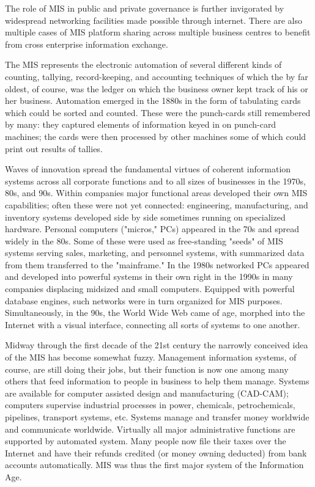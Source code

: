 \documentclass[
  openany]{book}
\begin{document}
\begin{questions}
The role of MIS in public and private governance is further invigorated by widespread networking facilities made possible through internet. There are also multiple cases of MIS platform sharing across multiple business centres to benefit from cross enterprise information exchange.

The MIS represents the electronic automation of several different kinds of counting, tallying, record-keeping, and accounting techniques of which the by far oldest, of course, was the ledger on which the business owner kept track of his or her business. Automation emerged in the 1880s in the form of tabulating cards which could be sorted and counted. These were the punch-cards still remembered by many: they captured elements of information keyed in on punch-card machines; the cards were then processed by other machines some of which could print out results of tallies. 

Waves of innovation spread the fundamental virtues of coherent information systems across all corporate functions and to all sizes of businesses in the 1970s, 80s, and 90s. Within companies major functional areas developed their own MIS capabilities; often these were not yet connected: engineering, manufacturing, and inventory systems developed side by side sometimes running on specialized hardware. Personal computers ("micros," PCs) appeared in the 70s and spread widely in the 80s. Some of these were used as free-standing "seeds" of MIS systems serving sales, marketing, and personnel systems, with summarized data from them transferred to the "mainframe." In the 1980s networked PCs appeared and developed into powerful systems in their own right in the 1990s in many companies displacing midsized and small computers. Equipped with powerful database engines, such networks were in turn organized for MIS purposes. Simultaneously, in the 90s, the World Wide Web came of age, morphed into the Internet with a visual interface, connecting all sorts of systems to one another.

Midway through the first decade of the 21st century the narrowly conceived idea of the MIS has become somewhat fuzzy. Management information systems, of course, are still doing their jobs, but their function is now one among many others that feed information to people in business to help them manage. Systems are available for computer assisted design and manufacturing (CAD-CAM); computers supervise industrial processes in power, chemicals, petrochemicals, pipelines, transport systems, etc. Systems manage and transfer money worldwide and communicate worldwide. Virtually all major administrative functions are supported by automated system. Many people now file their taxes over the Internet and have their refunds credited (or money owning deducted) from bank accounts automatically. MIS was thus the first major system of the Information Age. 


\end{questions}
\end{document}
